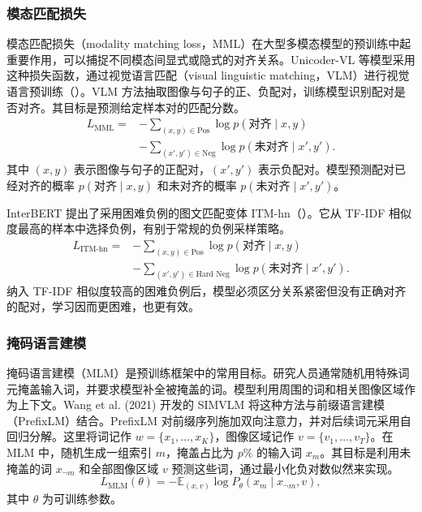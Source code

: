 \subsubsection{模态匹配损失}
模态匹配损失（modality matching loss，MML）在大型多模态模型的预训练中起重要作用，可以捕捉不同模态间显式或隐式的对齐关系。Unicoder-VL 等模型采用这种损失函数，通过视觉语言匹配（visual linguistic matching，VLM）进行视觉语言预训练（）。VLM 方法抽取图像与句子的正、负配对，训练模型识别配对是否对齐。其目标是预测给定样本对的匹配分数。
\begin{equation}
\begin{aligned}
L_{\mathrm{MML}}={}&-\sum_{(x,y)\in\mathrm{Pos}}
  \log p(\text{对齐}\mid x,y)\\
&-\sum_{(x',y')\in\mathrm{Neg}}
  \log p(\text{未对齐}\mid x',y').
\end{aligned}
\label{eq:ch09-modality-matching-loss}
\end{equation}
其中 $(x,y)$ 表示图像与句子的正配对，$(x',y')$ 表示负配对。模型预测配对已经对齐的概率 $p(\text{对齐}\mid x,y)$ 和未对齐的概率 $p(\text{未对齐}\mid x',y')$。

InterBERT 提出了采用困难负例的图文匹配变体 ITM-hn（）。它从 TF-IDF 相似度最高的样本中选择负例，有别于常规的负例采样策略。
\begin{equation}
\begin{aligned}
L_{\mathrm{ITM\text{-}hn}}={}&-\sum_{(x,y)\in\mathrm{Pos}}
  \log p(\text{对齐}\mid x,y)\\
&-\sum_{(x',y')\in\text{Hard Neg}}
  \log p(\text{未对齐}\mid x',y').
\end{aligned}
\label{eq:ch09-hard-negative-matching-loss}
\end{equation}
纳入 TF-IDF 相似度较高的困难负例后，模型必须区分关系紧密但没有正确对齐的配对，学习因而更困难，也更有效。

\subsubsection{掩码语言建模}
掩码语言建模（MLM）是预训练框架中的常用目标。研究人员通常随机用特殊词元掩盖输入词，并要求模型补全被掩盖的词。模型利用周围的词和相关图像区域作为上下文。Wang et al. (2021) 开发的 SIMVLM 将这种方法与前缀语言建模（PrefixLM）结合。PrefixLM 对前缀序列施加双向注意力，并对后续词元采用自回归分解。这里将词记作 $w=\{x_1,\ldots,x_K\}$，图像区域记作 $v=\{v_1,\ldots,v_T\}$。在 MLM 中，随机生成一组索引 $m$，掩盖占比为 $p\%$ 的输入词 $x_m$。其目标是利用未掩盖的词 $x_{\neg m}$ 和全部图像区域 $v$ 预测这些词，通过最小化负对数似然来实现。
\begin{equation}
L_{\mathrm{MLM}}(\theta)=-\mathbb{E}_{(x,v)}
\log P_\theta(x_m\mid x_{\neg m},v),
\label{eq:ch09-mlm-loss}
\end{equation}
其中 $\theta$ 为可训练参数。

